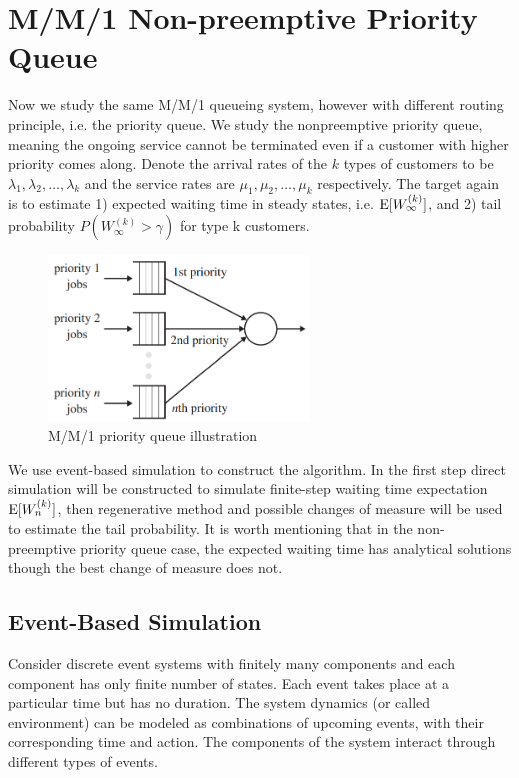 \documentclass{article}
\begin{document}
\section{M/M/1 Non-preemptive Priority Queue}
Now we study the same M/M/1 queueing system, however with different routing principle, i.e. the priority queue. We study the nonpreemptive priority queue, meaning the ongoing service cannot be terminated even if a customer with higher priority comes along. Denote the arrival rates of the $k$ types of customers to be $\lambda_1,\lambda_2,\dots ,\lambda_k$ and the service rates are $\mu_1, \mu_2, \dots, \mu_k$ respectively. The target again is to estimate 1) expected waiting time in steady states, i.e. ${\rm E}[W_{\infty}^{(k)}]$, and 2) tail probability $P(W_{\infty}^{(k)}>\gamma)$ for type k customers. 
\begin{figure}[H]
	\centering
	\includegraphics[height=4.4cm]{./figures/priority.png}
	\caption{M/M/1 priority queue illustration}
	\label{fig:fig1}
\end{figure}
We use event-based simulation to construct the algorithm. In the first step direct simulation will be constructed to simulate finite-step waiting time expectation ${\rm E}[W_n^{(k)}]$, then regenerative method and possible changes of measure will be used to estimate the tail probability. It is worth mentioning that in the non-preemptive priority queue case, the expected waiting time has analytical solutions though the best change of measure does not.

\subsection{Event-Based Simulation}

Consider discrete event systems with finitely many components and each component has only finite number of states. Each event takes place at a particular time but has no duration. The system dynamics (or called environment) can be modeled as combinations of upcoming events, with their corresponding time and action. The components of the system interact through different types of events. 
\end{document}
